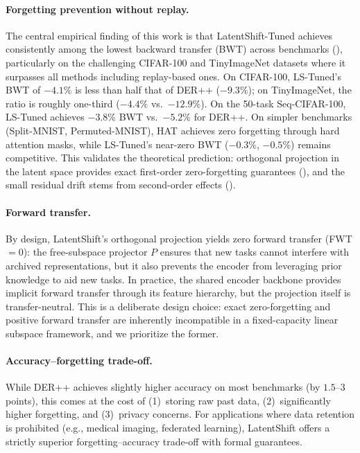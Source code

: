 \documentclass{article}
\begin{document}
\paragraph{Forgetting prevention without replay.}
The central empirical finding of this work is that LatentShift-Tuned achieves
consistently among the lowest backward transfer (BWT) across benchmarks (),
particularly on the challenging CIFAR-100 and TinyImageNet datasets where it
surpasses all methods including replay-based ones. On CIFAR-100,
LS-Tuned's BWT of $-4.1\%$ is less than half that of DER++ ($-9.3\%$); on
TinyImageNet, the ratio is roughly one-third ($-4.4\%$ vs.\ $-12.9\%$).
On the 50-task Seq-CIFAR-100, LS-Tuned achieves $-3.8\%$ BWT vs.\ $-5.2\%$
for DER++. On simpler benchmarks (Split-MNIST, Permuted-MNIST), HAT achieves
zero forgetting through hard attention masks, while LS-Tuned's near-zero BWT
($-0.3\%$, $-0.5\%$) remains competitive. This validates the theoretical prediction: orthogonal projection in
the latent space provides exact first-order zero-forgetting guarantees
(), and the small residual drift stems from
second-order effects ().

\paragraph{Forward transfer.}
By design, LatentShift's orthogonal projection yields zero forward
transfer (FWT $= 0$): the free-subspace projector $P$ ensures that
new tasks cannot interfere with archived representations, but it
also prevents the encoder from leveraging prior knowledge to aid new
tasks. In practice, the shared encoder backbone provides implicit
forward transfer through its feature hierarchy, but the projection
itself is transfer-neutral. This is a deliberate design choice:
exact zero-forgetting and positive forward transfer are inherently
incompatible in a fixed-capacity linear subspace framework, and we
prioritize the former.

\paragraph{Accuracy--forgetting trade-off.}
While DER++ achieves slightly higher accuracy on most benchmarks (by $1.5$--$3$
points), this comes at the cost of (1)~storing raw past data,
(2)~significantly higher forgetting, and (3)~privacy concerns. For
applications where data retention is prohibited (e.g., medical imaging,
federated learning), LatentShift offers a strictly superior
forgetting--accuracy trade-off with formal guarantees.
\end{document}
